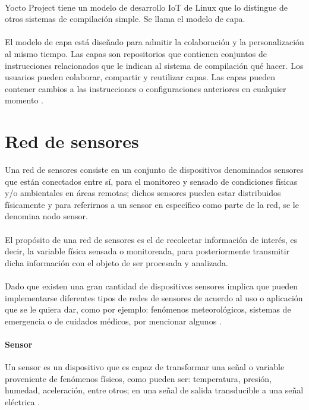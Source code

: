 \paragraph{}
Yocto Project tiene un modelo de desarrollo IoT de Linux que lo distingue de otros sistemas de compilación simple. Se llama el modelo de capa.
\paragraph{}
El modelo de capa está diseñado para admitir la colaboración y la personalización al mismo tiempo. Las capas son repositorios que contienen conjuntos de instrucciones relacionados que le indican al sistema de compilación qué hacer. Los usuarios pueden colaborar, compartir y reutilizar capas. Las capas pueden contener cambios a las instrucciones o configuraciones anteriores en cualquier momento \citep{MarcoTeoricoYocto2}.


\section{Red de sensores}
Una red de sensores consiste en un conjunto de dispositivos denominados sensores que están conectados entre sí, para el monitoreo y sensado de condiciones físicas y/o ambientales en áreas remotas; dichos sensores pueden estar distribuidos físicamente y para referirnos a un sensor en específico como parte de la red, se le denomina nodo sensor. 
\paragraph{}
El propósito de una red de sensores es el de recolectar información de interés, es decir, la variable física sensada o monitoreada, para posteriormente transmitir dicha información con el objeto de ser procesada y analizada. 
\paragraph{}
Dado que existen una gran cantidad de dispositivos sensores implica que pueden implementarse diferentes tipos de redes de sensores de acuerdo al uso o aplicación que se le quiera dar, como por ejemplo: fenómenos meteorológicos, sistemas de emergencia o de cuidados médicos, por mencionar algunos \citep{MarcoTeorico16}.

\paragraph{Sensor}
Un sensor es un dispositivo que es capaz de transformar una señal o variable proveniente de fenómenos físicos, como pueden ser: temperatura, presión, humedad, aceleración, entre otros; en una señal de salida transducible a una señal eléctrica \citep{MarcoTeorico20} .

